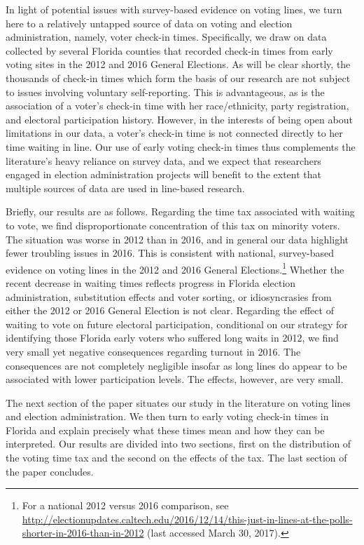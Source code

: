 \documentclass[12pt,titlepage]{article}
\begin{document}
In light of potential issues with survey-based evidence on voting
lines, we turn here to a relatively untapped source of data on voting
and election administration, namely, voter check-in
times. Specifically, we draw on data collected by several Florida
counties that recorded check-in times from early voting sites in the
2012 and 2016 General Elections.  As will be clear shortly, the
thousands of check-in times which form the basis of our research are
not subject to issues involving voluntary self-reporting.  This is
advantageous, as is the association of a voter's check-in time with
her race/ethnicity, party registration, and electoral participation
history.  However, in the interests of being open about limitations in
our data, a voter's check-in time is not connected directly to her
time waiting in line.  Our use of early voting check-in times thus
complements the literature's heavy reliance on survey data, and we
expect that researchers engaged in election administration projects
will benefit to the extent that multiple sources of data are used in
line-based research.

Briefly, our results are as follows.  Regarding the time tax
associated with waiting to vote, we find disproportionate
concentration of this tax on minority voters.  The situation was worse
in 2012 than in 2016, and in general our data highlight fewer
troubling issues in 2016.  This is consistent with national,
survey-based evidence on voting lines in the 2012 and 2016 General
Elections.\footnote{For a national 2012 versus 2016 comparison, see
  \url{http://electionupdates.caltech.edu/2016/12/14/this-just-in-lines-at-the-polls-shorter-in-2016-than-in-2012}
  (last accessed March 30, 2017).}  Whether the recent decrease in
waiting times reflects progress in Florida election administration,
substitution effects and voter sorting, or idiosyncrasies from either
the 2012 or 2016 General Election is not clear.  Regarding the effect
of waiting to vote on future electoral participation, conditional on
our strategy for identifying those Florida early voters who suffered
long waits in 2012, we find very small yet negative consequences
regarding turnout in 2016. The consequences are not completely
negligible insofar as long lines do appear to be associated with lower
participation levels.  The effects, however, are very small.

The next section of the paper situates our study in the literature on
voting lines and election administration.  We then turn to early
voting check-in times in Florida and explain precisely what these
times mean and how they can be interpreted.  Our results are divided
into two sections, first on the distribution of the voting time tax
and the second on the effects of the tax.  The last section of the
paper concludes.
\end{document}
